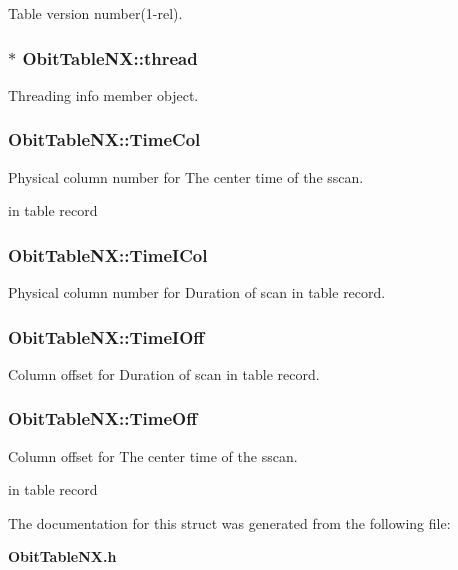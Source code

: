 Table version number(1-rel). 

\subsubsection{$\ast$ {\bf Obit\-Table\-NX::thread}}\label{structObitTableNX_o4}


Threading info member object. 

\subsubsection{ {\bf Obit\-Table\-NX::Time\-Col}}\label{structObitTableNX_o16}


Physical column number for The center time of the sscan. 

in table record 
\subsubsection{ {\bf Obit\-Table\-NX::Time\-ICol}}\label{structObitTableNX_o18}


Physical column number for Duration of scan in table record. 

\subsubsection{ {\bf Obit\-Table\-NX::Time\-IOff}}\label{structObitTableNX_o17}


Column offset for Duration of scan in table record. 

\subsubsection{ {\bf Obit\-Table\-NX::Time\-Off}}\label{structObitTableNX_o15}


Column offset for The center time of the sscan. 

in table record 

The documentation for this struct was generated from the following file:\begin{CompactItemize}
\item 
{\bf Obit\-Table\-NX.h}\end{CompactItemize}
